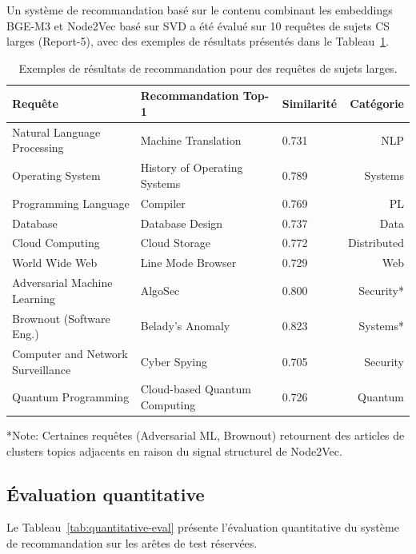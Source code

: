 Un système de recommandation basé sur le contenu combinant les embeddings BGE-M3 et Node2Vec basé sur SVD a été évalué sur 10 requêtes de sujets CS larges (Report-5), avec des exemples de résultats présentés dans le Tableau~\ref{tab:recommendation-results}.

\begin{table}[htbp]
\centering
\caption{Exemples de résultats de recommandation pour des requêtes de sujets larges.}
\label{tab:recommendation-results}
\begin{tabular}{lllr}
\toprule
\textbf{Requête} & \textbf{Recommandation Top-1} & \textbf{Similarité} & \textbf{Catégorie} \\
\midrule
Natural Language Processing & Machine Translation & 0.731 & NLP \\
Operating System & History of Operating Systems & 0.789 & Systems \\
Programming Language & Compiler & 0.769 & PL \\
Database & Database Design & 0.737 & Data \\
Cloud Computing & Cloud Storage & 0.772 & Distributed \\
World Wide Web & Line Mode Browser & 0.729 & Web \\
Adversarial Machine Learning & AlgoSec & 0.800 & Security* \\
Brownout (Software Eng.) & Belady's Anomaly & 0.823 & Systems* \\
Computer and Network Surveillance & Cyber Spying & 0.705 & Security \\
Quantum Programming & Cloud-based Quantum Computing & 0.726 & Quantum \\
\bottomrule
\end{tabular}
\end{table}

*Note: Certaines requêtes (Adversarial ML, Brownout) retournent des articles de clusters topics adjacents en raison du signal structurel de Node2Vec.

\subsection{Évaluation quantitative}

Le Tableau~\ref{tab:quantitative-eval} présente l'évaluation quantitative du système de recommandation sur les arêtes de test réservées.

